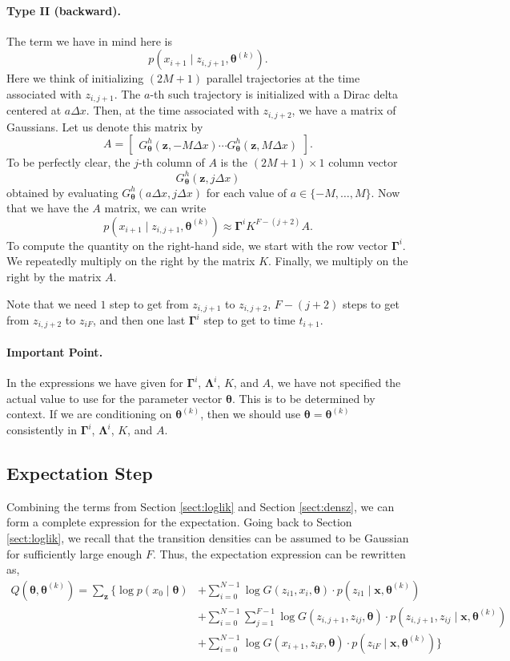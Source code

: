 \documentclass[12pt]{article}
\newcommand{\bx}{\ensuremath{\mathbf{x}}}
\newcommand{\bz}{\ensuremath{\mathbf{z}}}
\newcommand{\btheta}{\ensuremath{\boldsymbol{\theta}}}
\newcommand{\bLambda}{\ensuremath{\boldsymbol{\Lambda}}}
\newcommand{\bGamma}{\ensuremath{\boldsymbol{\Gamma}}}
\begin{document}
\paragraph{Type II (backward).} The term we have in mind here is
$$
p(x_{i+1} \mid z_{i,j+1}, \btheta^{(k)}).
$$
Here we think of initializing $(2M+1)$ parallel trajectories at the time 
associated with $z_{i,j+1}$.  The $a$-th such trajectory is initialized with a Dirac delta centered at $a \Delta x$.  Then, at the time associated with $z_{i,j+2}$, we have a matrix of Gaussians.  Let us denote this matrix by
$$
A = \begin{bmatrix} G^h_{\btheta}( \mathbf{z}, -M \Delta x) \cdots
G^h_{\btheta}( \mathbf{z}, M \Delta x ) \end{bmatrix}.
$$
To be perfectly clear, the $j$-th column of $A$ is the $(2M+1) \times 1$ column vector
$$
G^h_{\btheta}( \mathbf{z}, j \Delta x)
$$
obtained by evaluating $G^h_{\btheta}( a \Delta x, j \Delta x)$ for each value of $a \in \{-M, \ldots, M\}$.  Now that we have the $A$ matrix, we can write
$$
p(x_{i+1} \mid z_{i,j+1}, \btheta^{(k)}) \approx \bGamma^i K^{F - (j+2)} A.
$$
To compute the quantity on the right-hand side, we start with the row vector $\bGamma^i$.  We repeatedly multiply on the right by the matrix $K$.  Finally, we multiply on the right by the matrix $A$.

Note that we need $1$ step to get from $z_{i,j+1}$ to $z_{i,j+2}$, $F-(j+2)$ steps to get from $z_{i,j+2}$ to $z_{iF}$, and then one last $\bGamma^i$ step to get to time $t_{i+1}$.

\paragraph{Important Point.} In the expressions we have given for $\bGamma^i$, $\bLambda^i$, $K$, and $A$, we have not specified the actual value to use for the parameter vector $\btheta$.  This is to be determined by context.  If we are conditioning on $\btheta^{(k)}$, then we should use $\btheta = \btheta^{(k)}$ consistently in $\bGamma^i$, $\bLambda^i$, $K$, and $A$.


\subsection{Expectation Step}
Combining the terms from Section \ref{sect:loglik} and Section \ref{sect:densz}, we can form a complete expression for the expectation. Going back to Section \ref{sect:loglik}, we recall that the transition densities can be assumed to be Gaussian for sufficiently large enough $F$. Thus, the expectation expression can be rewritten as,
\begin{align}
Q(\btheta, \btheta^{(k)}) = \sum_{\bz} \Big \{ \log p(x_0 \mid \btheta) & + \sum_{i=0}^{N-1} \log G(z_{i1}, x_i, \btheta) \cdot p(z_{i1} \mid \bx, \btheta^{(k)}) \nonumber \\
& + \sum_{i=0}^{N-1} \sum_{j=1}^{F-1} \log G(z_{i,j+1}, z_{ij}, \btheta) \cdot p(z_{i,j+1}, z_{ij} \mid \bx, \btheta^{(k)}) \nonumber \\
& + \sum_{i=0}^{N-1} \log G(x_{i+1}, z_{iF}, \btheta) \cdot p(z_{iF} \mid \bx, \btheta^{(k)}) \Big \}
\end{align}
\end{document}
